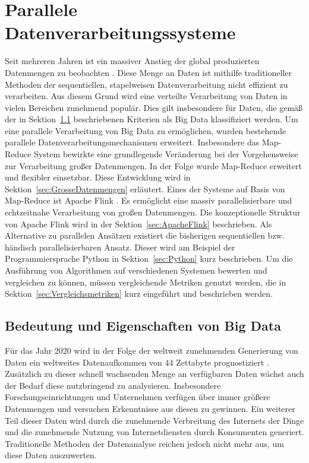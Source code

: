 
\section{Parallele Datenverarbeitungssysteme}
Seit mehreren Jahren ist ein massiver Anstieg der global produzierten Datenmengen zu beobachten \cite{EMC2014}. Diese Menge an Daten ist mithilfe traditioneller Methoden der sequentiellen, stapelweisen Datenverarbeitung nicht effizient zu verarbeiten. Aus diesem Grund wird eine verteilte Verarbeitung von Daten in vielen Bereichen zunehmend populär. Dies gilt insbesondere für Daten, die gemäß der in Sektion~\ref{sec:BigData} beschriebenen Kriterien als Big Data klassifiziert werden. Um eine parallele Verarbeitung von Big Data zu ermöglichen, wurden bestehende parallele Datenverarbeitungsmechanismen erweitert. Insbesondere das Map-Reduce System \cite{Dean2004} bewirkte eine grundlegende Veränderung bei der Vorgehensweise zur Verarbeitung großer Datenmengen. In der Folge wurde Map-Reduce erweitert und flexibler einsetzbar. Diese Entwicklung wird in Sektion~\ref{sec:GrosseDatenmengen} erläutert. Eines der Systeme auf Basis von Map-Reduce ist Apache Flink \cite{FlinkWebsite}. Es ermöglicht eine massiv parallelisierbare und echtzeitnahe Verarbeitung von großen Datenmengen. Die konzeptionelle Struktur von Apache Flink wird in der Sektion~\ref{sec:ApacheFlink} beschrieben. Als Alternative zu parallelen Ansätzen existiert die bisherigen sequentiellen bzw. händisch parallelisierbaren Ansatz. Dieser wird am Beispiel der Programmiersprache Python in Sektion~\ref{sec:Python} kurz beschrieben. Um die Ausführung von Algorithmen auf verschiedenen Systemen bewerten und vergleichen zu können, müssen vergleichende Metriken genutzt werden, die in Sektion~\ref{sec:Vergleichsmetriken} kurz eingeführt und beschrieben werden. 

\subsection{Bedeutung und Eigenschaften von Big Data}
\label{sec:BigData}
Für das Jahr 2020 wird in der Folge der weltweit zunehmenden Generierung von Daten ein weltweites Datenaufkommen von 44 Zettabyte prognostiziert \cite{EMC2014}. Zusätzlich zu dieser schnell wachsenden Menge an verfügbaren Daten wächst auch der Bedarf diese nutzbringend zu analysieren. Insbesondere Forschungseinrichtungen und Unternehmen verfügen über immer größere Datenmengen und versuchen Erkenntnisse aus diesen zu gewinnen. Ein weiterer Teil dieser Daten wird durch die zunehmende Verbreitung des Internets der Dinge und die zunehmende Nutzung von Internetdiensten durch Konsumenten generiert. Traditionelle Methoden der Datenanalyse reichen jedoch nicht mehr aus, um diese Daten auszuwerten. 

